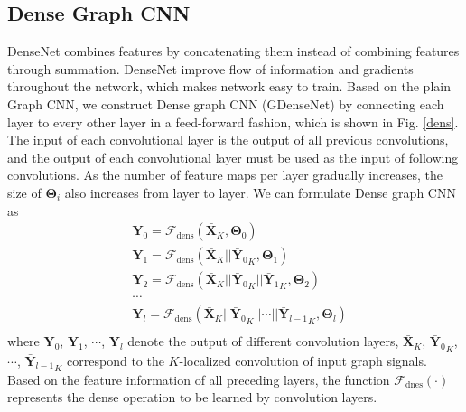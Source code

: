\documentclass[journal]{IEEEtran}
\begin{document}
\subsection{Dense Graph CNN}
DenseNet combines features by concatenating them instead of combining features through summation. DenseNet improve flow of information and gradients throughout the network, which makes network easy to train.
Based on the plain Graph CNN, we construct Dense graph CNN (G\underline{\hspace{0.5em}}DenseNet) by connecting each layer to every other layer in a feed-forward fashion, which is shown in Fig. \ref{dens}.
The input of each convolutional layer is the output of all previous convolutions, and the output of each convolutional layer must be used as the input of following convolutions.
As the number of feature maps per layer gradually increases, the size of $\mathbf{\Theta}_{i}$ also increases from layer to layer. We can formulate Dense graph CNN as
\begin{equation}
\begin{aligned}
& \mathbf{Y}_{0} =\mathcal{F}_{\text{dens}}(\mathbf{\bar{X}}_K, \mathbf{\Theta}_{0})\\
& \mathbf{Y}_{1} =\mathcal{F}_{\text{dens}}(\mathbf{\bar{X}}_K || \mathbf{\bar{Y}}{_{0}}_K, \mathbf{\Theta}_{1})\\
& \mathbf{Y}_{2} =\mathcal{F}_{\text{dens}}(\mathbf{\bar{X}}_K || \mathbf{\bar{Y}}{_{0}}_K || \mathbf{\bar{Y}}{_{1}}_K, \mathbf{\Theta}_{2})\\
&\cdots\\
& \mathbf{Y}_{l} =\mathcal{F}_{\text{dens}}(\mathbf{\bar{X}}_K || \mathbf{\bar{Y}}{_{0}}_K || \cdots || \mathbf{\bar{Y}}{_{l-1}}_K, \mathbf{\Theta}_{l})\\
\label{des}
\end{aligned}
\end{equation}
where $\mathbf{Y}_{0}$, $\mathbf{Y}_{1}$, $\cdots$, $\mathbf{Y}_{l}$ denote the output of different convolution layers, $\mathbf{\bar{X}}_K$, $\mathbf{\bar{Y}}{_{0}}_K$, $\cdots$, $\mathbf{\bar{Y}}{_{l-1}}_K$ correspond to the $K$-localized convolution of input graph signals.
Based on the feature information of all preceding layers, the function $\mathcal{F}_{\text{dnes}}(\cdot)$ represents the dense operation to be learned by convolution layers.
\end{document}
